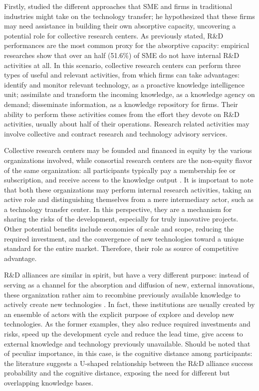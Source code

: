 Firstly, \citet{Spithoven2011} studied the different approaches that SME and firms in traditional industries might take on the technology transfer; he hypothesized that these firms may need assistance in building their own absorptive capacity, uncovering a potential role for collective research centers. As previously stated, R\&D performances are the most common proxy for the absorptive capacity: empirical researches show that over an half (51.6\%) of SME do not have internal R\&D activities at all. In this scenario, collective research centers can perform three types of useful and relevant activities, from which firms can take advantages: identify and monitor relevant technology, as a proactive knowledge intelligence unit; assimilate and transform the incoming knowledge, as a knowledge agency on demand; disseminate information, as a knowledge repository for firms. Their ability to perform these activities comes from the effort they devote on R\&D activities, usually about half of their operations. Research related activities may involve collective and contract research and technology advisory services.

Collective research centers may be founded and financed in equity by the various organizations involved, while consortial research centers are the non-equity flavor of the same organization: all participants typically pay a membership fee or subscription, and receive access to the knowledge output \citep{Hayton2013}. It is important to note that both these organizations may perform internal research activities, taking an active role and distinguishing themselves from a mere intermediary actor, such as a technology transfer center. In this perspective, they are a mechanism for sharing the risks of the development, especially for truly innovative projects. Other potential benefits include economies of scale and scope, reducing the required investment, and the convergence of new technologies toward a unique standard for the entire market. Therefore, their role as source of competitive advantage.

R\&D alliances are similar in spirit, but have a very different purpose: instead of serving as a channel for the absorption and diffusion of new, external innovations, these organization rather aim to recombine previously available knowledge to actively create new technologies \citep{Lin2012}. In fact, these institutions are usually created by an ensemble of actors with the explicit purpose of explore and develop new technologies. As the former examples, they also reduce required investments and risks, speed up the development cycle and reduce the lead time, give access to external knowledge and technology previously unavailable. Should be noted that of peculiar importance, in this case, is the cognitive distance among participants: the literature suggests a U-shaped relationship between the R\&D alliance success probability and the cognitive distance, exposing the need for different but overlapping knowledge bases.

